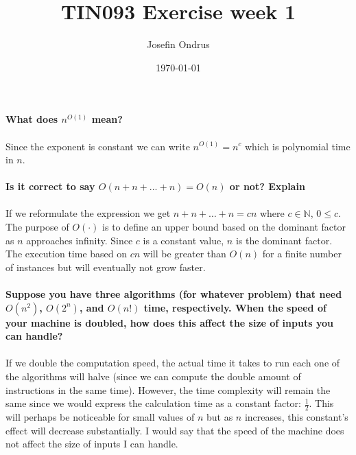 \documentclass[12pt,oneside,reqno]{amsart}
\begin{document}
\setlength{\parindent}{6pt}
\def\code#1{\texttt{#1}} %

\title{TIN093 Exercise week 1}
\author{Josefin Ondrus}
\date{\today}
\maketitle

\textbf{What does $n^{O(1)}$ mean?}\\\\
Since the exponent is constant we can write $n^{O(1)}=n^c$ which is polynomial time in $n$.\\\\

\textbf{Is it correct to say $O(n+n+...+n) = O(n)$ or not? Explain}\\\\
If we reformulate the expression we get $n+n+\dots+n=cn$ where $c \in \mathbb{N}$, $0 \leq c$. The purpose of $O(\cdot)$ is to define an upper bound based on the dominant factor as $n$ approaches infinity. Since $c$ is a constant value, $n$ is the dominant factor. The execution time based on $cn$ will be greater than $O(n)$ for a finite number of instances but will eventually not grow faster. \\\\

\textbf{Suppose you have three algorithms (for whatever problem) that need $O(n^2)$, $O(2^n)$, and $O(n!)$ time, respectively. When the speed of your machine is doubled, how does this affect the size of inputs you can handle?}\\\\
If we double the computation speed, the actual time it takes to run each one of the algorithms will halve (since we can compute the double amount of instructions in the same time). However, the time complexity will remain the same since we would express the calculation time as a constant factor: $\frac{1}{2}$. This will perhaps be noticeable for small values of $n$ but as $n$ increases, this constant's effect will decrease substantially. I would say that the speed of the machine does not affect the size of inputs I can handle.\\\\
\end{document}
